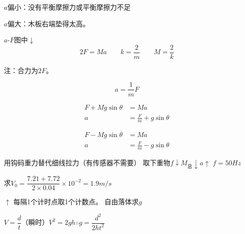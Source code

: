 $a$偏小：没有平衡摩擦力或平衡摩擦力不足

$a$偏大：木板右端垫得太高。


$a$-$F$图中$\downarrow$
\[2F=Ma\qquad k=\frac{2}{m}\qquad M=\frac{2}{k}\] %

注：合力为$2F$。

\[a=\frac{1}{m}F\]

\begin{align*}
F+Mg\sin\theta&=Ma\\
a&=\frac{F}{m}+g\sin\theta %
\end{align*}

\begin{align*}
F-Mg\sin\theta&=Ma\\
a&=\frac{F}{m}-g\sin\theta %
\end{align*}

用钩码重力替代细线拉力（有传感器不需要）
取下重物\quad $f\downarrow$\quad $M_{\text{总}}\downarrow$\quad $a\uparrow$
$f=50\unit{Hz}$


求$V_0=\dfrac{7.21+7.72}{2\times0.04}\times10^{-2}=1.9\unit{m/s}$

$\uparrow$ 每隔1个计时点取1个计数点。
自由落体求$g$

$V=\dfrac{d}{t}$（瞬时）\qquad $V^2=2gh$\qquad $\therefore g=\dfrac{d^2}{2ht^2}$


